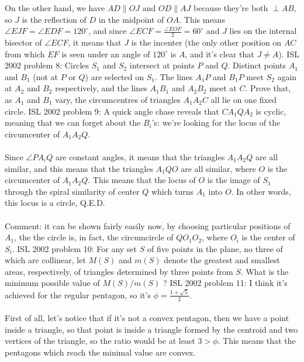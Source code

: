 On the other hand, we have $AD\|OJ$ and $OD\|AJ$ because they're both $\perp AB$, so $J$ is the reflection of $D$ in the midpoint of $OA$. This means $\angle EJF=\angle EDF=120^{\circ}$, and since $\angle ECF=\frac{\angle EOF}2=60^{\circ}$ and $J$ lies on the internal bisector of $\angle ECF$, it means that $J$ is the incenter (the only other position on $AC$ from which $EF$ is seen under an angle of $120^{\circ}$ is $A$, and it's clear that $J\ne A$). 
ISL 2002 problem 8:  Circles $S_1$ and $S_2$ intersect at points $P$ and $Q$. Distinct points $A_1$ and $B_1$ (not at $P$ or $Q$) are selected on $S_1$. The lines $A_1P$ and $B_1P$ meet $S_2$ again at $A_2$ and $B_2$ respectively, and the lines $A_1B_1$ and $A_2B_2$ meet at $C$.  Prove that, as $A_1$ and $B_1$ vary, the circumcentres of triangles $A_1A_2C$ all lie on one fixed circle. 
ISL 2002 problem 9:  A quick angle chase reveals that $CA_1QA_2$ is cyclic, meaning that we can forget about the $B_i$'s: we're looking for the locus of the circumcenter of $A_1A_2Q$. \\\\
Since $\angle PA_iQ$ are constant angles, it means that the triangles $A_1A_2Q$ are all similar, and this means that the triangles $A_1QO$ are all similar, where $O$ is the circumcenter of $A_1A_2Q$. This means that the locus of $O$ is the image of $S_1$ through the spiral similarity of center $Q$ which turns $A_1$ into $O$. In other words, this locus is a circle, Q.E.D. \\\\
Comment: it can be shown fairly easily now, by choosing particular positions of $A_1$, the the circle is, in fact, the circumcircle of $QO_1O_2$, where $O_i$ is the center of $S_i$. 
ISL 2002 problem 10:  For any set $S$ of five points in the plane, no three of which are collinear, let $M(S)$ and $m(S)$ denote the greatest and smallest areas, respectively, of triangles determined by three points from $S$.  What is the minimum possible value of $M(S)/m(S)$ ? 
ISL 2002 problem 11:  I think it's achieved for the regular pentagon, so it's $\phi=\frac{1+\sqrt 5}2$. \\\\
First of all, let's notice that if it's not a convex pentagon, then we have a point inside a triangle, so that point is inside a triangle formed by the centroid and two vertices of the triangle, so the ratio would be at least $3>\phi$. This means that the pentagons which reach the minimal value are convex. \\\\
